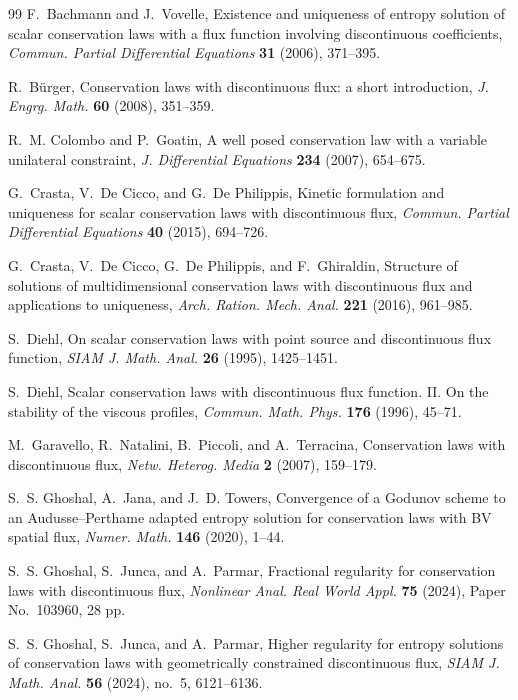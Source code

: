 \documentclass[11pt]{amsart}
\numberwithin{equation}{section}
\theoremstyle{plain}
\theoremstyle{definition}
\theoremstyle{remark}
\begin{document}
\begin{thebibliography}{99}
F.~Bachmann and J.~Vovelle,
Existence and uniqueness of entropy solution of scalar conservation laws with a flux function involving discontinuous coefficients,
\emph{Commun. Partial Differential Equations} \textbf{31} (2006), 371--395.

R.~B\"urger,
Conservation laws with discontinuous flux: a short introduction,
\emph{J. Engrg. Math.} \textbf{60} (2008), 351--359.

R.~M. Colombo and P.~Goatin,
A well posed conservation law with a variable unilateral constraint,
\emph{J. Differential Equations} \textbf{234} (2007), 654--675.

G.~Crasta, V.~De Cicco, and G.~De Philippis,
Kinetic formulation and uniqueness for scalar conservation laws with discontinuous flux,
\emph{Commun. Partial Differential Equations} \textbf{40} (2015), 694--726.

G.~Crasta, V.~De Cicco, G.~De Philippis, and F.~Ghiraldin,
Structure of solutions of multidimensional conservation laws with discontinuous flux and applications to uniqueness,
\emph{Arch. Ration. Mech. Anal.} \textbf{221} (2016), 961--985.

S.~Diehl,
On scalar conservation laws with point source and discontinuous flux function,
\emph{SIAM J. Math. Anal.} \textbf{26} (1995), 1425--1451.

S.~Diehl,
Scalar conservation laws with discontinuous flux function. II. On the stability of the viscous profiles,
\emph{Commun. Math. Phys.} \textbf{176} (1996), 45--71.

M.~Garavello, R.~Natalini, B.~Piccoli, and A.~Terracina,
Conservation laws with discontinuous flux,
\emph{Netw. Heterog. Media} \textbf{2} (2007), 159--179.

S.~S. Ghoshal, A.~Jana, and J.~D. Towers,
Convergence of a Godunov scheme to an Audusse--Perthame adapted entropy solution for conservation laws with BV spatial flux,
\emph{Numer. Math.} \textbf{146} (2020), 1--44.

S.~S. Ghoshal, S.~Junca, and A.~Parmar,
Fractional regularity for conservation laws with discontinuous flux,
\emph{Nonlinear Anal. Real World Appl.} \textbf{75} (2024), Paper No.~103960, 28 pp.

S.~S. Ghoshal, S.~Junca, and A.~Parmar,
Higher regularity for entropy solutions of conservation laws with geometrically constrained discontinuous flux,
\emph{SIAM J. Math. Anal.} \textbf{56} (2024), no.~5, 6121--6136.


\end{thebibliography}
\end{document}
